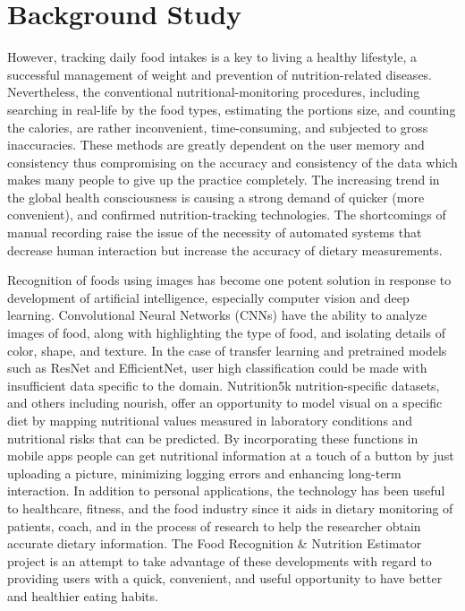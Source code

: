 \documentclass[12pt, openany]{report}
\begin{document}
\chapter{Background Study}
However, tracking daily food intakes is a key to living a healthy lifestyle, a successful management of weight and prevention of nutrition-related diseases. Nevertheless, the conventional nutritional-monitoring procedures, including searching in real-life by the food types, estimating the portions size, and counting the calories, are rather inconvenient, time-consuming, and subjected to gross inaccuracies. These methods are greatly dependent on the user memory and consistency thus compromising on the accuracy and consistency of the data which makes many people to give up the practice completely. The increasing trend in the global health consciousness is causing a strong demand of quicker (more convenient), and confirmed nutrition-tracking technologies. The shortcomings of manual recording raise the issue of the necessity of automated systems that decrease human interaction but increase the accuracy of dietary measurements.

Recognition of foods using images has become one potent solution in response to development of artificial intelligence, especially computer vision and deep learning. Convolutional Neural Networks (CNNs) have the ability to analyze images of food, along with highlighting the type of food, and isolating details of color, shape, and texture. In the case of transfer learning and pretrained models such as ResNet and EfficientNet, user high classification could be made with insufficient data specific to the domain. Nutrition5k nutrition-specific datasets, and others including nourish, offer an opportunity to model visual on a specific diet by mapping nutritional values measured in laboratory conditions and nutritional risks that can be predicted. By incorporating these functions in mobile apps people can get nutritional information at a touch of a button by just uploading a picture, minimizing logging errors and enhancing long-term interaction. In addition to personal applications, the technology has been useful to healthcare, fitness, and the food industry since it aids in dietary monitoring of patients, coach, and in the process of research to help the researcher obtain accurate dietary information. The Food Recognition \& Nutrition Estimator project is an attempt to take advantage of these developments with regard to providing users with a quick, convenient, and useful opportunity to have better and healthier eating habits.
\end{document}
